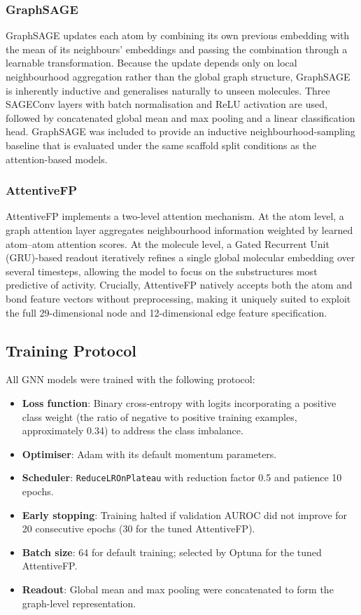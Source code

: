 \subsubsection{GraphSAGE}

GraphSAGE \parencite{hamilton2017graphsage} updates each atom by combining its own
previous embedding with the mean of its neighbours' embeddings and passing the
combination through a learnable transformation. Because the update depends only on
local neighbourhood aggregation rather than the global graph structure, GraphSAGE
is inherently inductive and generalises naturally to unseen molecules. Three
SAGEConv layers with batch normalisation and ReLU activation are used, followed by
concatenated global mean and max pooling and a linear classification head.
GraphSAGE was included to provide an inductive neighbourhood-sampling baseline that
is evaluated under the same scaffold split conditions as the attention-based models.

\subsubsection{AttentiveFP}

AttentiveFP implements a two-level attention mechanism. At the atom level, a graph
attention layer aggregates neighbourhood information weighted by learned
atom--atom attention scores. At the molecule level, a Gated Recurrent Unit
(GRU)-based readout iteratively refines a single global molecular embedding over
several timesteps, allowing the model to focus on the substructures most predictive
of activity. Crucially, AttentiveFP natively accepts both the atom and bond feature
vectors without preprocessing, making it uniquely suited to exploit the full
29-dimensional node and 12-dimensional edge feature specification.

\subsection{Training Protocol}

All GNN models were trained with the following protocol:
\begin{itemize}
    \item \textbf{Loss function}: Binary cross-entropy with logits incorporating
          a positive class weight (the ratio of negative to positive training
          examples, approximately 0.34) to address the class imbalance.
    \item \textbf{Optimiser}: Adam with its default momentum parameters.
    \item \textbf{Scheduler}: \texttt{ReduceLROnPlateau} with reduction factor 0.5
          and patience 10 epochs.
    \item \textbf{Early stopping}: Training halted if validation AUROC did not
          improve for 20 consecutive epochs (30 for the tuned AttentiveFP).
    \item \textbf{Batch size}: 64 for default training; selected by Optuna for the
          tuned AttentiveFP.
    \item \textbf{Readout}: Global mean and max pooling were concatenated to form
          the graph-level representation.
\end{itemize}

